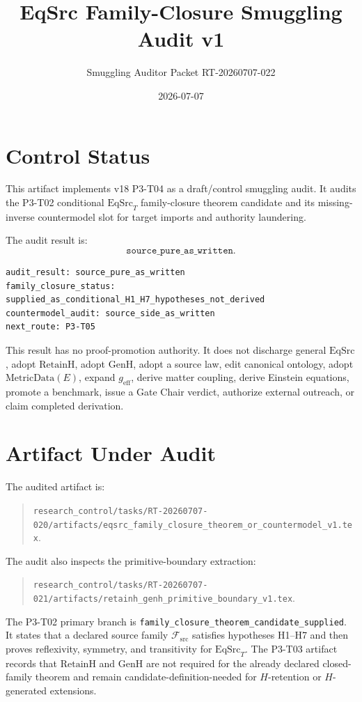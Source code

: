 \documentclass[11pt]{article}
\title{EqSrc Family-Closure Smuggling Audit v1}
\author{Smuggling Auditor Packet RT-20260707-022}
\date{2026-07-07}
\newcommand{\EqSrc}{\mathrm{EqSrc}}
\newcommand{\EqSrcT}{\mathrm{EqSrc}_{T}}
\newcommand{\RetainH}{\mathrm{RetainH}}
\newcommand{\GenH}{\mathrm{GenH}}
\newcommand{\Fsrc}{\mathcal{F}_{\mathrm{src}}}
\begin{document}
\maketitle

\section{Control Status}

This artifact implements v18 P3-T04 as a draft/control smuggling audit. It
audits the P3-T02 conditional \(\EqSrcT\) family-closure theorem candidate and
its missing-inverse countermodel slot for target imports and authority
laundering.

The audit result is:
\[
  \texttt{source\_pure\_as\_written}.
\]

\begin{verbatim}
audit_result: source_pure_as_written
family_closure_status: supplied_as_conditional_H1_H7_hypotheses_not_derived
countermodel_audit: source_side_as_written
next_route: P3-T05
\end{verbatim}

This result has no proof-promotion authority. It does not discharge general
\(\EqSrc\), adopt \(\RetainH\), adopt \(\GenH\), adopt a source law, edit
canonical ontology, adopt \(\mathrm{MetricData}(E)\), expand
\(g_{\mathrm{eff}}\), derive matter coupling, derive Einstein equations,
promote a benchmark, issue a Gate Chair verdict, authorize external outreach,
or claim completed derivation.

\section{Artifact Under Audit}

The audited artifact is:
\begin{quote}
\texttt{research\_control/tasks/RT-20260707-020/artifacts/eqsrc\_family\_closure\_theorem\_or\_countermodel\_v1.tex}.
\end{quote}

The audit also inspects the primitive-boundary extraction:
\begin{quote}
\texttt{research\_control/tasks/RT-20260707-021/artifacts/retainh\_genh\_primitive\_boundary\_v1.tex}.
\end{quote}

The P3-T02 primary branch is
\texttt{family\_closure\_theorem\_candidate\_supplied}. It states that a
declared source family \(\Fsrc\) satisfies hypotheses H1--H7 and then proves
reflexivity, symmetry, and transitivity for \(\EqSrcT\). The P3-T03 artifact
records that \(\RetainH\) and \(\GenH\) are not required for the already
declared closed-family theorem and remain candidate-definition-needed for
\(H\)-retention or \(H\)-generated extensions.
\end{document}
